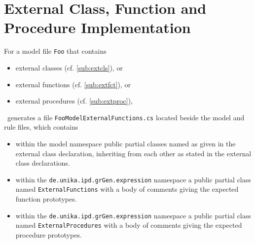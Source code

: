 \section{External Class, Function and Procedure Implementation}\label{sub:extclsfctimpl}

For a model file \texttt{Foo} that contains 
\begin{itemize}
	\item external classes (cf. \ref{sub:extcls}), or
	\item external functions (cf. \ref{sub:extfct}), or 
	\item external procedures (cf. \ref{sub:extproc}), 
\end{itemize}
\GrG~generates a file \texttt{FooModelExternalFunctions.cs} located beside the model and rule files, which contains
\begin{itemize}
	\item within the model namespace public partial classes named as given in the external class declaration,
inheriting from each other as stated in the external class declarations.
	\item within the \texttt{de.unika.ipd.grGen.expression} namespace a public partial class named \texttt{ExternalFunctions} with a body of comments giving the expected function prototypes.
	\item within the \texttt{de.unika.ipd.grGen.expression} namespace a public partial class named \texttt{ExternalProcedures} with a body of comments giving the expected procedure prototypes.
\end{itemize}

\pagebreak

